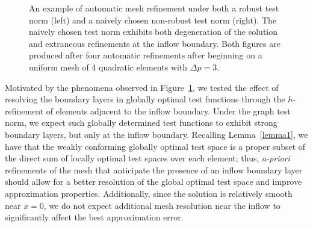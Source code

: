 \documentclass[11pt,onecolumn]{scrartcl}
\begin{document}
\begin{figure}[!h]
\centering
{}
\caption{An example of automatic mesh refinement under both a robust test norm (left) and a naively chosen non-robust test norm (right).  The naively chosen test norm exhibits both degeneration of the solution and extraneous refinements at the inflow boundary.  Both figures are produced after four automatic refinements after beginning on a uniform mesh of 4 quadratic elements with $\Delta p=3$.}
\label{fig:nonRobustness}
\end{figure}

Motivated by the phenomena observed in Figure~\ref{fig:nonRobustness}, we tested the effect of resolving the boundary layers in globally optimal test functions through the $h$-refinement of elements adjacent to the inflow boundary.  Under the graph test norm, we expect such globally determined test functions to exhibit strong boundary layers, but only at the inflow boundary.  Recalling Lemma~\ref{lemma1}, we have that the weakly conforming globally optimal test space is a proper subset of the direct sum of locally optimal test spaces over each element; thus, \textit{a-priori} refinements of the mesh that anticipate the presence of an inflow boundary layer should allow for a better resolution of the global optimal test space and improve approximation properties.  Additionally, since the solution is relatively smooth near $x=0$, we do not expect additional mesh resolution near the inflow to significantly affect the best approximation error.  
\end{document}
